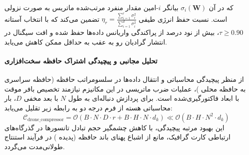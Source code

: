 که در آن $\sigma_i(\mathbf{W})$ بیانگر $i$-امین مقدار منفرد مرتب‌شده ماتریس به صورت نزولی است. نسبت حفظ انرژی طیفی $\eta_r = \frac{\sum_{i=1}^r \sigma_i^2}{\sum_{i=1}^{d} \sigma_i^2}$ تضمین می‌کند که با انتخاب آستانه $\tau \ge 0.90$، بیش از نود درصد از پراکندگی واریانس داده‌ها حفظ شده و افت سیگنال در انتشار گرادیان رو به عقب به حداقل ممکن کاهش می‌یابد.

\paragraph{تحلیل مجانبی و پیچیدگی اشتراک حافظه سخت‌افزاری}
از منظر پیچیدگی محاسباتی و انتقال داده‌ها در سلسومراتب حافظه (حافظه سراسری  به حافظه محلی )، عملیات ضرب ماتریسی در این مکانیزم نیازمند تخصیص بافر موقت با ابعاد فاکتورگیری‌شده است. برای پردازش دنباله‌ای به طول $N$ با بعد مخفی $D$، بار محاسباتی هسته از فرم درجه دو به رابطه زیر تقلیل می‌یابد:
\begin{equation}
\label{eq:complexity_drone_compressor}
\mathcal{C}_{\text{drone\_compressor}} = \mathcal{O}\left( B \cdot N \cdot D \cdot r + B \cdot H \cdot N \cdot d_k \right) \ll \mathcal{O}\left( B \cdot H \cdot N^2 \cdot d_k \right)
\end{equation}
این بهبود مرتبه پیچیدگی، با کاهش چشمگیر حجم تبادل تانسورها در گذرگاه‌های ارتباطی کارت گرافیک، مانع از اشباع پهنای باند حافظه (پدیده ) در فرآیند استنتاج طولانی‌مدت می‌گردد.
